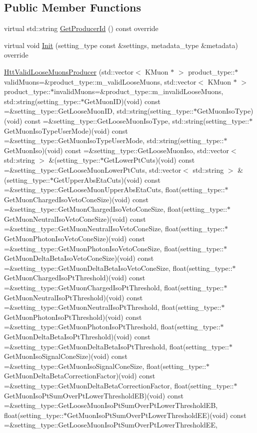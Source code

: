 \subsection*{Public Member Functions}
\begin{DoxyCompactItemize}
\item 
virtual std::string \hyperlink{classHttValidLooseMuonsProducer_a5da103c0889ac8e7592d3d382db58255}{GetProducerId} () const override
\item 
virtual void \hyperlink{classHttValidLooseMuonsProducer_a5b90c679cc8f4bf597e1435928402e4c}{Init} (setting\_\-type const \&settings, metadata\_\-type \&metadata) override
\item 
\hyperlink{classHttValidLooseMuonsProducer_aad92720a3c5d251a0e6a5d8737285963}{HttValidLooseMuonsProducer} (std::vector$<$ KMuon $\ast$ $>$ product\_\-type::$\ast$validMuons=\&product\_\-type::m\_\-validLooseMuons, std::vector$<$ KMuon $\ast$ $>$ product\_\-type::$\ast$invalidMuons=\&product\_\-type::m\_\-invalidLooseMuons, std::string(setting\_\-type::$\ast$GetMuonID)(void) const =\&setting\_\-type::GetLooseMuonID, std::string(setting\_\-type::$\ast$GetMuonIsoType)(void) const =\&setting\_\-type::GetLooseMuonIsoType, std::string(setting\_\-type::$\ast$GetMuonIsoTypeUserMode)(void) const =\&setting\_\-type::GetMuonIsoTypeUserMode, std::string(setting\_\-type::$\ast$GetMuonIso)(void) const =\&setting\_\-type::GetLooseMuonIso, std::vector$<$ std::string $>$ \&(setting\_\-type::$\ast$GetLowerPtCuts)(void) const =\&setting\_\-type::GetLooseMuonLowerPtCuts, std::vector$<$ std::string $>$ \&(setting\_\-type::$\ast$GetUpperAbsEtaCuts)(void) const =\&setting\_\-type::GetLooseMuonUpperAbsEtaCuts, float(setting\_\-type::$\ast$GetMuonChargedIsoVetoConeSize)(void) const =\&setting\_\-type::GetMuonChargedIsoVetoConeSize, float(setting\_\-type::$\ast$GetMuonNeutralIsoVetoConeSize)(void) const =\&setting\_\-type::GetMuonNeutralIsoVetoConeSize, float(setting\_\-type::$\ast$GetMuonPhotonIsoVetoConeSize)(void) const =\&setting\_\-type::GetMuonPhotonIsoVetoConeSize, float(setting\_\-type::$\ast$GetMuonDeltaBetaIsoVetoConeSize)(void) const =\&setting\_\-type::GetMuonDeltaBetaIsoVetoConeSize, float(setting\_\-type::$\ast$GetMuonChargedIsoPtThreshold)(void) const =\&setting\_\-type::GetMuonChargedIsoPtThreshold, float(setting\_\-type::$\ast$GetMuonNeutralIsoPtThreshold)(void) const =\&setting\_\-type::GetMuonNeutralIsoPtThreshold, float(setting\_\-type::$\ast$GetMuonPhotonIsoPtThreshold)(void) const =\&setting\_\-type::GetMuonPhotonIsoPtThreshold, float(setting\_\-type::$\ast$GetMuonDeltaBetaIsoPtThreshold)(void) const =\&setting\_\-type::GetMuonDeltaBetaIsoPtThreshold, float(setting\_\-type::$\ast$GetMuonIsoSignalConeSize)(void) const =\&setting\_\-type::GetMuonIsoSignalConeSize, float(setting\_\-type::$\ast$GetMuonDeltaBetaCorrectionFactor)(void) const =\&setting\_\-type::GetMuonDeltaBetaCorrectionFactor, float(setting\_\-type::$\ast$GetMuonIsoPtSumOverPtLowerThresholdEB)(void) const =\&setting\_\-type::GetLooseMuonIsoPtSumOverPtLowerThresholdEB, float(setting\_\-type::$\ast$GetMuonIsoPtSumOverPtLowerThresholdEE)(void) const =\&setting\_\-type::GetLooseMuonIsoPtSumOverPtLowerThresholdEE, 
\end{DoxyCompactItemize}
